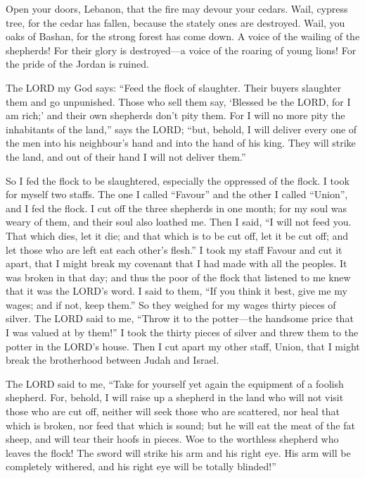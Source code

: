  Open your doors, Lebanon, that the fire may devour your
cedars.  Wail, cypress tree, for the cedar has fallen,
because the stately ones are destroyed. Wail, you oaks of Bashan, for
the strong forest has come down.  A voice of the wailing
of the shepherds! For their glory is destroyed---a voice of the roaring
of young lions! For the pride of the Jordan is ruined.

 The LORD my God says: ``Feed the flock of slaughter.
 Their buyers slaughter them and go unpunished. Those who
sell them say, `Blessed be the LORD, for I am rich;' and their own
shepherds don't pity them.  For I will no more pity the
inhabitants of the land,'' says the LORD; ``but, behold, I will deliver
every one of the men into his neighbour's hand and into the hand of his
king. They will strike the land, and out of their hand I will not
deliver them.''

 So I fed the flock to be slaughtered, especially the
oppressed of the flock. I took for myself two staffs. The one I called
``Favour'' and the other I called ``Union'', and I fed the flock.
 I cut off the three shepherds in one month; for my soul
was weary of them, and their soul also loathed me.  Then I
said, ``I will not feed you. That which dies, let it die; and that which
is to be cut off, let it be cut off; and let those who are left eat each
other's flesh.''  I took my staff Favour and cut it
apart, that I might break my covenant that I had made with all the
peoples.  It was broken in that day; and thus the poor of
the flock that listened to me knew that it was the LORD's word.
 I said to them, ``If you think it best, give me my
wages; and if not, keep them.'' So they weighed for my wages thirty
pieces of silver.  The LORD said to me, ``Throw it to the
potter---the handsome price that I was valued at by them!'' I took the
thirty pieces of silver and threw them to the potter in the LORD's
house.  Then I cut apart my other staff, Union, that I
might break the brotherhood between Judah and Israel.

 The LORD said to me, ``Take for yourself yet again the
equipment of a foolish shepherd.  For, behold, I will
raise up a shepherd in the land who will not visit those who are cut
off, neither will seek those who are scattered, nor heal that which is
broken, nor feed that which is sound; but he will eat the meat of the
fat sheep, and will tear their hoofs in pieces.  Woe to
the worthless shepherd who leaves the flock! The sword will strike his
arm and his right eye. His arm will be completely withered, and his
right eye will be totally blinded!''

